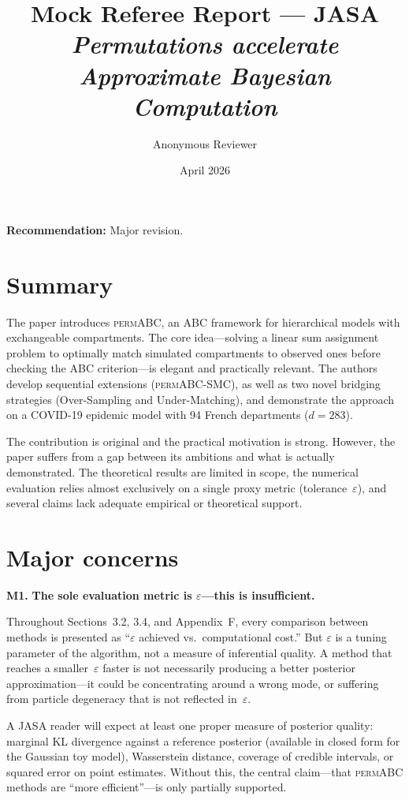 \documentclass[11pt,a4paper]{article}
\title{Mock Referee Report --- JASA\\[6pt]
\large\textit{Permutations accelerate Approximate Bayesian Computation}}
\author{Anonymous Reviewer}
\date{April 2026}
\newcommand{\major}[1]{\textbf{\color{red!70!black}M#1.}}
\begin{document}
\maketitle

\noindent\textbf{Recommendation:} Major revision.

\section*{Summary}

The paper introduces \textsc{permABC}, an ABC framework for hierarchical models with exchangeable compartments. The core idea---solving a linear sum assignment problem to optimally match simulated compartments to observed ones before checking the ABC criterion---is elegant and practically relevant. The authors develop sequential extensions (\textsc{permABC-SMC}), as well as two novel bridging strategies (Over-Sampling and Under-Matching), and demonstrate the approach on a COVID-19 epidemic model with 94 French departments ($d=283$).

The contribution is original and the practical motivation is strong. However, the paper suffers from a gap between its ambitions and what is actually demonstrated. The theoretical results are limited in scope, the numerical evaluation relies almost exclusively on a single proxy metric (tolerance~$\varepsilon$), and several claims lack adequate empirical or theoretical support.

\section*{Major concerns}

\major{1} \textbf{The sole evaluation metric is $\varepsilon$---this is insufficient.}

Throughout Sections~3.2, 3.4, and Appendix~F, every comparison between methods is presented as ``$\varepsilon$ achieved vs.\ computational cost.'' But $\varepsilon$ is a tuning parameter of the algorithm, not a measure of inferential quality. A method that reaches a smaller~$\varepsilon$ faster is not necessarily producing a better posterior approximation---it could be concentrating around a wrong mode, or suffering from particle degeneracy that is not reflected in~$\varepsilon$.

A JASA reader will expect at least one proper measure of posterior quality: marginal KL divergence against a reference posterior (available in closed form for the Gaussian toy model), Wasserstein distance, coverage of credible intervals, or squared error on point estimates. Without this, the central claim---that \textsc{permABC} methods are ``more efficient''---is only partially supported.
\end{document}
